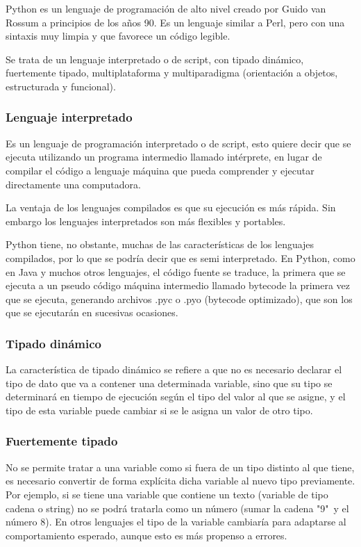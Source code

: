 \documentclass[12pt,legalpaper]{report}
\begin{document}
Python es un lenguaje de programación de alto nivel creado por Guido van Rossum a principios de los años 90.  Es un lenguaje similar a Perl, pero con una sintaxis muy limpia y que favorece un código legible.

Se trata de un lenguaje interpretado o de script, con tipado dinámico, fuertemente tipado, multiplataforma y multiparadigma (orientación a objetos, estructurada y funcional).

			\subsubsection{Lenguaje interpretado}

Es un lenguaje de programación interpretado o de script, esto quiere decir que se ejecuta utilizando un programa intermedio llamado intérprete, en lugar de compilar el código a lenguaje máquina que pueda comprender y ejecutar directamente una computadora.

La ventaja de los lenguajes compilados es que su ejecución es más rápida. Sin embargo los lenguajes interpretados son más flexibles y portables.

Python tiene, no obstante, muchas de las características de los lenguajes compilados, por lo que se podría decir que es semi interpretado. En Python, como en Java y muchos otros lenguajes, el código fuente se traduce, la primera que se ejecuta a un pseudo código máquina intermedio llamado bytecode la primera vez que se ejecuta, generando archivos .pyc o .pyo (bytecode optimizado), que son los que se ejecutarán en sucesivas ocasiones.


			\subsubsection{Tipado dinámico}

La característica de tipado dinámico se refiere a que no es necesario declarar el tipo de dato que va a contener una determinada variable, sino que su tipo se determinará en tiempo de ejecución según el tipo del valor al que se asigne, y el tipo de esta variable puede cambiar si se le asigna un valor de otro tipo.


			\subsubsection{Fuertemente tipado}

No se permite tratar a una variable como si fuera de un tipo distinto al que tiene, es necesario convertir de forma explícita dicha variable al nuevo tipo previamente. Por ejemplo, si se tiene una variable que contiene un texto (variable de tipo cadena o string) no se podrá tratarla como un número (sumar la cadena "9"\ y el número 8). En otros lenguajes el tipo de la variable cambiaría para adaptarse al comportamiento esperado, aunque esto es más propenso a errores.
\end{document}

